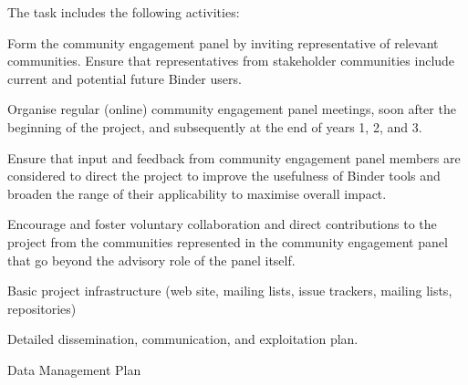\begin{workpackage}[id=management,type=MGT,wphases=0-36!.25,
  title=Project management,
  short=Management,
  lead=SRL,
  MPRM=1,
  QSRM=1,
  IFRRM=1,
  UIORM=1,
  SRLRM=12,
  swsites
]
\begin{tasklist}
\begin{task}[
  title=Community Engagement Panel,
  id=community-engagement-panel,
  lead=SRL,
  PM=2,
  wphases={0-36!.056},
  partners={MP,QS,UIO,IFR},
  ]

The task includes the following activities:
\begin{compacteitem}
\item Form the community engagement panel by inviting representative of relevant
  communities. Ensure that representatives from stakeholder communities include
  current and potential future Binder users.
\item Organise regular (online) community engagement panel meetings, soon after the
  beginning of the project, and subsequently at the end of years 1, 2, and 3.
\item Ensure that input and feedback from community engagement panel members are
  considered to direct the project to improve the usefulness of Binder tools
  and broaden the range of their applicability to maximise overall impact.
\item Encourage and foster voluntary collaboration and direct contributions to
  the project from the communities represented in the community engagement
  panel that go beyond the advisory role of the panel itself.
\end{compacteitem}

\end{task}
\end{tasklist}


\begin{wpdelivs}

\begin{wpdeliv}[due=2,id=infrastructure,dissem=PU,nature=DEC,lead=SRL]
  {Basic project infrastructure (web site, mailing lists, issue trackers, mailing lists, repositories)}
\end{wpdeliv}


  \begin{wpdeliv}[due=3,id=dissemination-plan,dissem=PU,nature=R,lead=SRL]
    {Detailed dissemination, communication, and exploitation plan.}
  \end{wpdeliv}


\begin{wpdeliv}[due=6,id=data-management-plan,dissem=PU,nature=DMP,lead=SRL]
  {Data Management Plan}
\end{wpdeliv}


\end{wpdelivs}
\end{workpackage}
